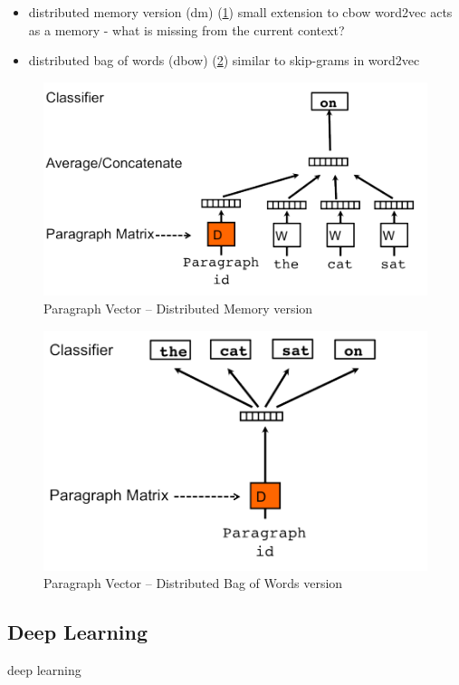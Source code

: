 \begin{itemize}
    \item distributed memory version (dm) (\cref{fig:doc2vec_dm})
      \subitem small extension to cbow word2vec
      \subitem acts as a memory - what is missing from the current context?
    \item distributed bag of words (dbow) (\cref{fig:doc2vec_dbow})
      \subitem similar to skip-grams in word2vec
\end{itemize}

\begin{figure}[h]
	\centering
	\includegraphics[height=0.2\textheight]{img/doc2vec_dm}
    \caption{Paragraph Vector -- Distributed Memory version\cite{doc2vec}}
    \label{fig:doc2vec_dm}
\end{figure}

\begin{figure}[h]
	\centering
	\includegraphics[height=0.2\textheight]{img/doc2vec_dbow}
	\caption{Paragraph Vector -- Distributed Bag of Words version\cite{doc2vec}}
	\label{fig:doc2vec_dbow}
\end{figure}

\subsection{Deep Learning}
deep learning\cite{Goodfellow}


